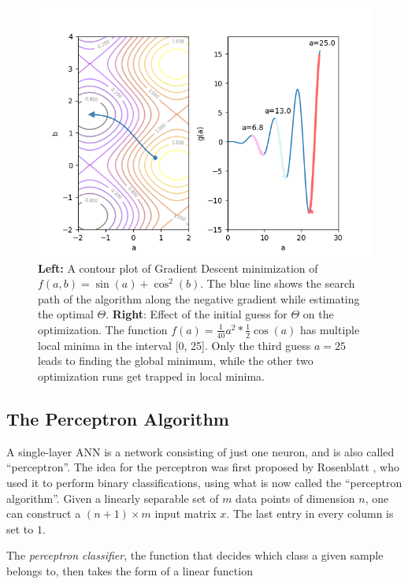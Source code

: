 \begin {figure}[!ht]
	\begin{center}
		\includegraphics[scale=0.9]{img/fig_grad_desc}
	\end{center}
	\caption{\textbf{Left:} A contour plot of Gradient Descent minimization of $f(a, b) = \sin(a) + \cos^2(b)$. The blue line shows the search path of the algorithm along the negative gradient while estimating the optimal $\Theta$. \textbf{Right}: Effect of the initial guess for $\Theta$ on the optimization. The function $f(a) = \frac{1}{40}a^2 * \frac{1}{2} \cos(a)$ has multiple local minima in the interval [0, 25]. Only the third guess $a=25$ leads to finding the global minimum, while the other two optimization runs get trapped in local minima.}
	\label{fig:grad_desc}
\end {figure}


	\subsection{The Perceptron Algorithm}
A single-layer ANN is a network consisting of just one neuron, and is also called ``perceptron''. The idea for the perceptron was first proposed by Rosenblatt \cite{rosenblatt_report, rosenblatt_book}, who used it to perform binary classifications, using what is now called the ``perceptron algorithm''. Given a linearly separable set of $m$ data points of dimension $n$, one can construct a $(n+1) \times m$ input matrix $x$. The last entry in every column is set to $1$.

The \textit{perceptron classifier}, the function that decides which class a given sample belongs to, then takes the form of a linear function

